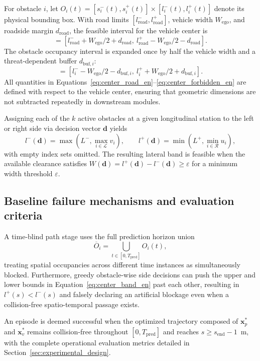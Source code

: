 For obstacle $i$, let $O_i(t)=[s_i^-(t),s_i^+(t)]\times[l_i^-(t),l_i^+(t)]$ denote its physical bounding box. With road limits $[l_{\mathrm{road}}^-,l_{\mathrm{road}}^+]$, vehicle width $W_{\mathrm{ego}}$, and roadside margin $d_{\mathrm{road}}$, the feasible interval for the vehicle center is
\begin{equation}
 [L^-,L^+]=[l_{\mathrm{road}}^-+W_{\mathrm{ego}}/2+d_{\mathrm{road}},\ l_{\mathrm{road}}^+-W_{\mathrm{ego}}/2-d_{\mathrm{road}}].
 \label{eq:center_road_en}
\end{equation}
The obstacle occupancy interval is expanded once by half the vehicle width and a threat-dependent buffer $d_{\mathrm{buf},i}$:
\begin{equation}
 [u_i,v_i]=[l_i^- -W_{\mathrm{ego}}/2-d_{\mathrm{buf},i},\ l_i^+ +W_{\mathrm{ego}}/2+d_{\mathrm{buf},i}].
 \label{eq:center_forbidden_en}
\end{equation}
All quantities in Equations~\ref{eq:center_road_en}--\ref{eq:center_forbidden_en} are defined with respect to the vehicle center, ensuring that geometric dimensions are not subtracted repeatedly in downstream modules.

Assigning each of the $k$ active obstacles at a given longitudinal station to the left or right side via decision vector $\mathbf{d}$ yields
\begin{equation}
 l^-(\mathbf{d})=\max\left(L^-,\max_{i\in\mathcal{L}}v_i\right),\qquad
 l^+(\mathbf{d})=\min\left(L^+,\min_{i\in\mathcal{R}}u_i\right),
 \label{eq:center_band_en}
\end{equation}
with empty index sets omitted. The resulting lateral band is feasible when the available clearance satisfies $W(\mathbf{d})=l^+(\mathbf{d})-l^-(\mathbf{d})\geq\varepsilon$ for a minimum width threshold $\varepsilon$.

\subsection{Baseline failure mechanisms and evaluation criteria}

A time-blind path stage uses the full prediction horizon union
\begin{equation}
 \overline{O}_i=\bigcup_{t\in[0,T_{\mathrm{pred}}]}O_i(t),
 \label{eq:prob_union_en}
\end{equation}
treating spatial occupancies across different time instances as simultaneously blocked. Furthermore, greedy obstacle-wise side decisions can push the upper and lower bounds in Equation~\ref{eq:center_band_en} past each other, resulting in $l^+(s)<l^-(s)$ and falsely declaring an artificial blockage even when a collision-free spatio-temporal passage exists.

An episode is deemed successful when the optimized trajectory composed of $\mathbf{x}_p^*$ and $\mathbf{x}_v^*$ remains collision-free throughout $[0,T_{\mathrm{pred}}]$ and reaches $s\geq s_{\mathrm{end}}-1$~m, with the complete operational evaluation metrics detailed in Section~\ref{sec:experimental_design}.
